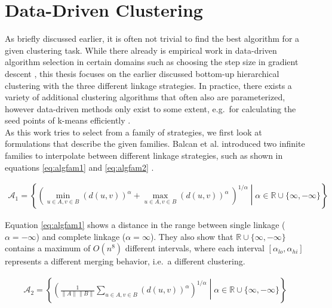 \section{Data-Driven Clustering}

As briefly discussed earlier, it is often not trivial to find the best algorithm for a given clustering task. While there already is empirical work in data-driven algorithm selection in certain domains such as choosing the step size in gradient descent \cite{DBLP:journals/corr/GuptaR15b}, this thesis focuses on the earlier discussed bottom-up hierarchical clustering with the three different linkage strategies. In practice, there exists a variety of additional clustering algorithms that often also are parameterized, however data-driven methods only exist to some extent, e.g.\ for calculating the seed points of k-means efficiently \cite{arthur2007k}.\\

As this work tries to select from a family of strategies, we first look at formulations that describe the given families. Balcan et al. introduced two infinite families to interpolate between different linkage strategies, such as shown in equations \ref{eq:algfam1} and \ref{eq:algfam2} \cite{DBLP:journals/corr/BalcanNVW16}.

\begin{equation}
    \begin{aligned}
        \mathcal{A}_1 = \left\{ \left( \min\limits_{u \in A, v \in B} (d(u,v))^\alpha + \max\limits_{u \in A, v \in B} (d(u,v))^\alpha\ \right)^{1 / \alpha} \middle| \alpha \in \mathbb{R} \cup \{\infty, -\infty\} \right\}
    \end{aligned}
    \label{eq:algfam1}
\end{equation}

Equation \ref{eq:algfam1} shows a distance in the range between single linkage ($\alpha = -\infty$) and complete linkage ($\alpha = \infty$). They also show that $\mathbb{R} \cup \{\infty, -\infty\}$ contains a maximum of $O(n^8)$ different intervals, where each interval $[\alpha_{lo}, \alpha_{hi}]$ represents a different merging behavior, i.e.\ a different clustering.

\begin{equation}
    \begin{aligned}
        \mathcal{A}_2 = \left\{ \left( \frac{1}{\|A\| \|B\|} \sum\limits_{u \in A, v \in B} (d(u,v))^\alpha \right)^{1 / \alpha} \middle| \alpha \in \mathbb{R} \cup \{\infty, -\infty\} \right\}
    \end{aligned}
    \label{eq:algfam2}
\end{equation}

